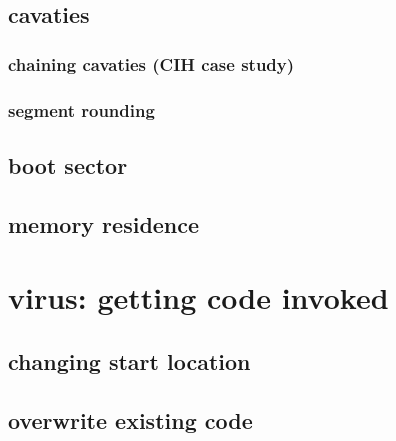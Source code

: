 


\subsection{cavaties}




\subsubsection{chaining cavaties (CIH case study)}



\subsubsection{segment rounding}


\subsection{boot sector}



\subsection{memory residence}


\section{virus: getting code invoked}



\subsection{changing start location}



\subsection{overwrite existing code}

